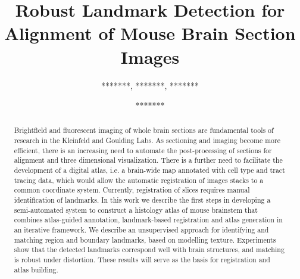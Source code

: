 \documentclass{llncs}
\begin{document}
\abovedisplayskip=2pt 
\abovedisplayshortskip=1pt
\belowdisplayskip=2pt 
\belowdisplayshortskip=1pt
\textfloatsep=5pt
\intextsep=3pt

%
%
\title{Robust Landmark Detection for Alignment of Mouse Brain Section Images}
%
%
\author{*******, *******, ******* \and *******}
%
%
%
\institute{************************
\and ************************
\and ************************}

\maketitle              %
\begin{abstract}

Brightfield and fluorescent imaging of whole brain sections are
fundamental tools of research in the Kleinfeld and Goulding Labs.  As
sectioning and imaging become more efficient, there is an increasing
need to automate the post-processing of sections for alignment and
three dimensional visualization. There is a further need to facilitate
the development of a digital atlas, i.e. a brain-wide map annotated
with cell type and tract tracing data, which would allow the automatic
registration of images stacks to a common coordinate
system. Currently, registration of slices requires manual
identification of landmarks. In this work we describe the first steps
in developing a semi-automated system to construct a histology atlas
of mouse brainstem that combines atlas-guided annotation,
landmark-based registration and atlas generation in an iterative
framework.
We describe an unsupervised approach for identifying and matching
region and boundary landmarks, based on modelling texture. Experiments
show that the detected landmarks correspond well with brain
structures, and matching is robust under distortion. These results
will serve as the basis for registration and atlas building.


\end{abstract}
%
\end{document}
